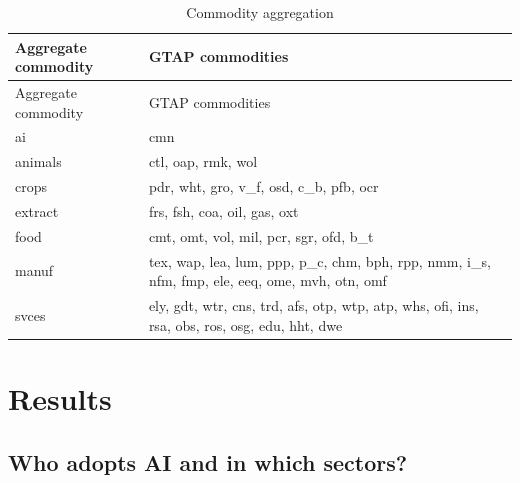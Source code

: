 \documentclass[
  authoryear,
  doubleblind]{elsarticle}
\begin{document}
\begin{longtable}[]{@{}
  >{\raggedright\arraybackslash}p{}
  >{\raggedright\arraybackslash}p{}@{}}
\caption{Commodity aggregation }\label{tbl-commodities}\tabularnewline
\toprule\noalign{}
\begin{minipage}[b]{\linewidth}\raggedright
Aggregate commodity
\end{minipage} & \begin{minipage}[b]{\linewidth}\raggedright
GTAP commodities
\end{minipage} \\
\midrule\noalign{}
\endfirsthead
\toprule\noalign{}
\begin{minipage}[b]{\linewidth}\raggedright
Aggregate commodity
\end{minipage} & \begin{minipage}[b]{\linewidth}\raggedright
GTAP commodities
\end{minipage} \\
\midrule\noalign{}
\endhead
\bottomrule\noalign{}
\endlastfoot
ai & cmn \\
animals & ctl, oap, rmk, wol \\
crops & pdr, wht, gro, v\_f, osd, c\_b, pfb, ocr \\
extract & frs, fsh, coa, oil, gas, oxt \\
food & cmt, omt, vol, mil, pcr, sgr, ofd, b\_t \\
manuf & tex, wap, lea, lum, ppp, p\_c, chm, bph, rpp, nmm, i\_s, nfm,
fmp, ele, eeq, ome, mvh, otn, omf \\
svces & ely, gdt, wtr, cns, trd, afs, otp, wtp, atp, whs, ofi, ins, rsa,
obs, ros, osg, edu, hht, dwe \\
\end{longtable}

\normalsize

\section{Results}\label{results}

\subsection{Who adopts AI and in which
sectors?}\label{who-adopts-ai-and-in-which-sectors}
\end{document}
